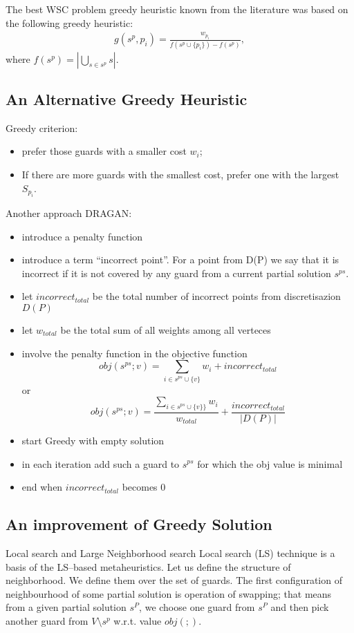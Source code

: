 \documentclass[runningheads,a4paper]{llncs}
\begin{document}
       The best WSC problem greedy heuristic known from the literature was based on the following greedy heuristic:
       \begin{align}
          g(s^p, p_i) = \frac{w_{p_i}}{ f(s^p \cup \{p_i\})  - f(s^p)},
       \end{align} 
      where $f(s^p) = |\bigcup_{s \in s^p} s |$.
        \subsection{An Alternative Greedy Heuristic}
         Greedy criterion:
          \begin{itemize}
          	\item prefer those guards with a smaller cost $w_i$;
          	\item If there are more guards with the smallest cost,
          	prefer one with the largest $S_{p_i}$.
          \end{itemize}
		 Another approach DRAGAN:
           \begin{itemize}
			\item introduce a penalty function
          	\item introduce a term ``incorrect point''. For a point from D(P) we say that it is incorrect if it is not covered by any guard from a current partial solution $s^{ps}$.
			\item let $incorrect_{total}$ be the total number of incorrect points from discretisazion $D(P)$
			\item let $w_{total}$ be the total sum of all weights among all verteces
			\item involve the penalty function in the objective function
				$$obj(s^{ps}; v)  = \sum_{i \in s^{ps} \cup \{v\}} w_i+ incorrect_{total}$$ or
				$$obj(s^{ps}; v) = \frac{\sum_{i \in s^{ps} \cup \{v\}\}} w_i}{w_{total}}+ \frac{incorrect_{total}}{|D(P)|}$$
			\item start Greedy with empty solution
			\item in each iteration add such a guard to $s^{ps}$ for which the obj value is minimal
			\item end when $incorrect_{total}$ becomes 0
          \end{itemize}
      \subsection{An improvement of Greedy Solution}
      Local search and Large Neighborhood search 
      Local search (LS) technique is a basis of the LS--based metaheuristics. Let us define the structure of neighborhood. We define them over the set of guards.
      The first configuration of neighbourhood of some partial solution is operation of swapping; that means from a given partial solution $s^P$, we choose one guard from $s^P$ and then pick another guard from $V \setminus s^p$ w.r.t. value $obj(;)$.
\end{document}
